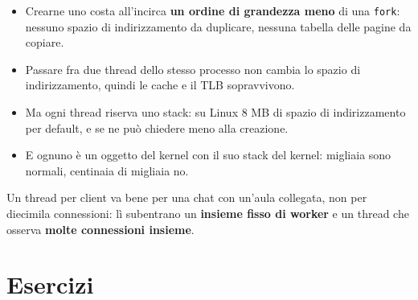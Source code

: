\begin{itemize}
    \item Crearne uno costa all'incirca \textbf{un ordine di grandezza meno} di una \texttt{fork}: nessuno spazio di
          indirizzamento da duplicare, nessuna tabella delle pagine da copiare.
    \item Passare fra due thread dello stesso processo non cambia lo spazio di indirizzamento, quindi le cache e il TLB
          sopravvivono.
    \item Ma ogni thread riserva uno stack: su Linux 8 MB di spazio di indirizzamento per default, e se ne può chiedere
          meno alla creazione.
    \item E ognuno è un oggetto del kernel con il suo stack del kernel: migliaia sono normali, centinaia di migliaia no.
\end{itemize}
Un thread per client va bene per una chat con un'aula collegata, non per diecimila connessioni: lì subentrano un
\textbf{insieme fisso di worker} e un thread che osserva \textbf{molte connessioni insieme}.

\section{Esercizi}

